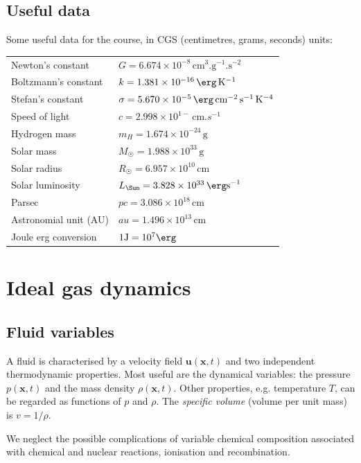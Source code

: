 \documentclass{jknotes}
\begin{document}
\subsection{Useful data}
Some useful data for the course, in CGS (centimetres, grams, seconds) units:
\begin{table}[h]
\begin{tabular}{ll}
	Newton's constant & $G = 6.674 \times 10^{-8} \,\si{\cm^3.\g^{-1}.\s^{-2}}$ \\
	Boltzmann's constant & $k = 1.381 \times 10^{-16} \, \si{\erg.\K^{-1}}$ \\
	Stefan's constant & $\sigma = 5.670 \times 10^{-5}
	\,\si{\erg.\cm^{-2}.s^{-1}.K^{-4}}$\\
	Speed of light & $c = 2.998 \times 10^{1-} \,\si{\cm.s^{-1}}$\\
	Hydrogen mass & $m_H = 1.674 \times 10^{-24} \, \si{\g}$\\
	Solar mass & $M_\Sun = 1.988 \times 10^{33} \,\si{\g}$\\
	Solar radius & $R_\Sun = 6.957 \times 10^{10} \, \si{\cm}$\\
	Solar luminosity & $L_\Sun = 3.828 \times 10^{33} \, \si{\erg \s^{-1}}$\\
	Parsec & $pc = 3.086 \times 10^{18} \, \si{\cm}$\\
	Astronomial unit (AU) & $au = 1.496 \times 10^{13} \, \si{\cm}$\\
	Joule erg conversion & $1 \si{\J} = 10^7 \si{\erg}$
\end{tabular}
\end{table}

\section{Ideal gas dynamics}
\subsection{Fluid variables}
A fluid is characterised by a velocity field $\symbf{u}(\symbf{x},t)$ and two
independent thermodynamic properties. Most useful are the dynamical variables:
the pressure $p(\symbf{x},t)$ and the mass density $\rho(\symbf{x},t)$. Other
properties, e.g. temperature $T$, can be regarded as functions of $p$ and
$\rho$. The \emph{specific volume} (volume per unit mass) is $v = 1/\rho$. 

We neglect the possible complications of variable chemical composition
associated with chemical and nuclear reactions, ionisation and recombination.
\end{document}
